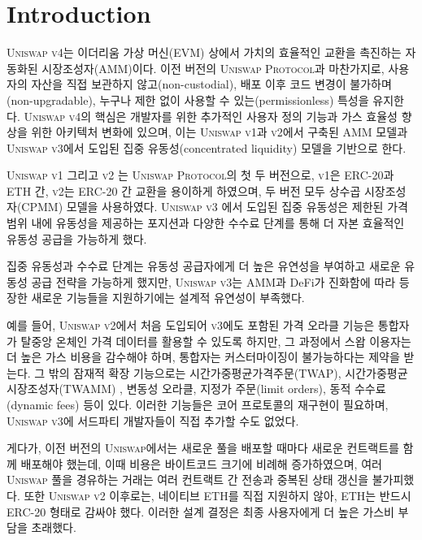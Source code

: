 \documentclass[sigconf,nonacm,prologue,table]{acmart}
\numberwithin{equation}{section}
\theoremstyle{definition}
\theoremstyle{remark}
\begin{document}
\maketitle

\section{Introduction} \label{sec:introduction}
\textsc{Uniswap v4}는 이더리움 가상 머신(EVM) 상에서 가치의 효율적인 교환을 촉진하는 자동화된 시장조성자(AMM)이다. 이전 버전의 \textsc{Uniswap Protocol}과 마찬가지로, 사용자의 자산을 직접 보관하지 않고(non-custodial), 배포 이후 코드 변경이 불가하며(non-upgradable), 누구나 제한 없이 사용할 수 있는(permissionless) 특성을 유지한다. \textsc{Uniswap v4}의 핵심은 개발자를 위한 추가적인 사용자 정의 기능과 가스 효율성 향상을 위한 아키텍처 변화에 있으며, 이는 \textsc{Uniswap v1}과 \textsc{v2}에서 구축된 AMM 모델과 \textsc{Uniswap v3}에서 도입된 집중 유동성(concentrated liquidity) 모델을 기반으로 한다.

\textsc{Uniswap v1} \cite{Adams18} 그리고 \textsc{v2} \cite{Adams20}는 \textsc{Uniswap Protocol}의 첫 두 버전으로, \textsc{v1}은 ERC-20과 ETH 간, \textsc{v2}는 ERC-20 간 교환을 용이하게 하였으며, 두 버전 모두 상수곱 시장조성자(CPMM) 모델을 사용하였다. \textsc{Uniswap v3} \cite{Adams21} 에서 도입된 집중 유동성은 제한된 가격 범위 내에 유동성을 제공하는 포지션과 다양한 수수료 단계를 통해 더 자본 효율적인 유동성 공급을 가능하게 했다.

집중 유동성과 수수료 단계는 유동성 공급자에게 더 높은 유연성을 부여하고 새로운 유동성 공급 전략을 가능하게 했지만, \textsc{Uniswap v3}는 AMM과 DeFi가 진화함에 따라 등장한 새로운 기능들을 지원하기에는 설계적 유연성이 부족했다.

예를 들어, \textsc{Uniswap v2}에서 처음 도입되어 \textsc{v3}에도 포함된 가격 오라클 기능은 통합자가 탈중앙 온체인 가격 데이터를 활용할 수 있도록 하지만, 그 과정에서 스왑 이용자는 더 높은 가스 비용을 감수해야 하며, 통합자는 커스터마이징이 불가능하다는 제약을 받는다. 그 밖의 잠재적 확장 기능으로는 시간가중평균가격주문(TWAP), 시간가중평균시장조성자(TWAMM) \cite{White2021}, 변동성 오라클, 지정가 주문(limit orders), 동적 수수료(dynamic fees) 등이 있다. 이러한 기능들은 코어 프로토콜의 재구현이 필요하며, \textsc{Uniswap v3}에 서드파티 개발자들이 직접 추가할 수도 없었다.

게다가, 이전 버전의 \textsc{Uniswap}에서는 새로운 풀을 배포할 때마다 새로운 컨트랙트를 함께 배포해야 했는데, 이때 비용은 바이트코드 크기에 비례해 증가하였으며, 여러 \textsc{Uniswap} 풀을 경유하는 거래는 여러 컨트랙트 간 전송과 중복된 상태 갱신을 불가피했다. 또한 \textsc{Uniswap v2} 이후로는, 네이티브 ETH를 직접 지원하지 않아, ETH는 반드시 ERC-20 형태로 감싸야 했다. 이러한 설계 결정은 최종 사용자에게 더 높은 가스비 부담을 초래했다.
\end{document}
